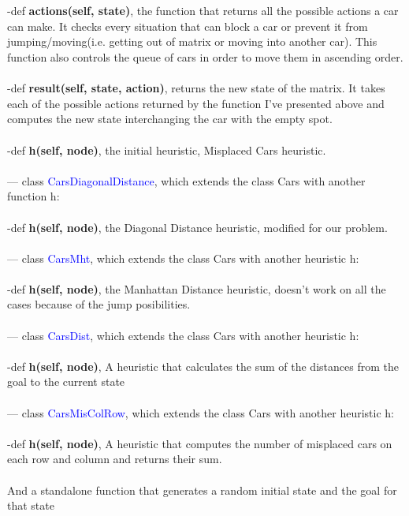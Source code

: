 \documentclass[14pt]{article}
\begin{document}
\\
\\
-def \textbf{actions(self, state)}, the function that returns all the possible actions a car can make. It checks every situation that can block a car or prevent it from jumping/moving(i.e. getting out of matrix or moving into another car). This function also controls the queue of cars in order to move them in ascending order.
\\
\\
-def \textbf{result(self, state, action)}, returns the new state of the matrix. It takes each of the possible actions returned by the function I've presented above and computes the new state interchanging the car with the empty spot.
\\
\\
-def \textbf{h(self, node)}, the initial heuristic, Misplaced Cars heuristic.
\\
\\--- class \textcolor{blue}{CarsDiagonalDistance}, which extends the class Cars with another function h:
\\
\\
-def \textbf{h(self, node)}, the Diagonal Distance heuristic, modified for our problem.
\\
\\--- class  \textcolor{blue}{CarsMht}, which extends the class Cars with another heuristic h:
\\
\\
-def \textbf{h(self, node)}, the Manhattan Distance heuristic, doesn't work on all the cases because of the jump posibilities.
\\
\\--- class \textcolor{blue}{CarsDist}, which extends the class Cars with another heuristic h:
\\
\\
-def \textbf{h(self, node)}, A heuristic that calculates the sum of the distances from the goal to the current state
\\
\\--- class \textcolor{blue}{CarsMisColRow}, which extends the class Cars with another heuristic h:
\\
\\
-def \textbf{h(self, node)}, A heuristic that computes the number of misplaced cars on each row and column and returns their sum.
\\
\\
And a standalone function that generates a random initial state and the goal for that state
\end{document}
